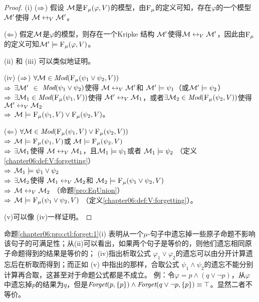 \begin{proof}
	(i) ($\Rightarrow$) 假设 ${\cal M}$是${\textsc{F}_{\textsc{$\mu$}}}(\varphi, V)$的模型，由${\textsc{F}_{\textsc{$\mu$}}}$的定义可知，存在$\varphi$的一个模型${\cal M}'$使得 ${\cal M} \leftrightarrow_V {\cal M}'$。
	
	($\Leftarrow$) 假定${\cal M}$是$\varphi$的模型，则存在一个Kripke 结构 ${\cal M}'$使得${\cal M} \leftrightarrow_V {\cal M}'$，因此由${\textsc{F}_{\textsc{$\mu$}}}$的定义可知${\cal M}' \models {\textsc{F}_{\textsc{$\mu$}}}(\varphi, V)$。
	
	(ii) 和 (iii) 可以类似地证明。
	
	(iv) ($\Rightarrow$) $\forall {\cal M}\in \textit{Mod}({\textsc{F}_{\textsc{$\mu$}}}(\psi_1 \vee \psi_2, V))$\\
	$\Rightarrow$ $\exists {\cal M}'$ $\in$  $\textit{Mod}(\psi_1\vee \psi_2)$使得 ${\cal M} \leftrightarrow_V {\cal M}'$和 ${\cal M}' \models \psi_1$（或${\cal M}' \models \psi_2$） \\
	$\Rightarrow$ $\exists {\cal M}_1 \in \textit{Mod}({\textsc{F}_{\textsc{$\mu$}}}(\psi_1, V))$使得 ${\cal M}' \leftrightarrow_V {\cal M}_1$，或者$\exists{\cal M}_2 \in \textit{Mod}({\textsc{F}_{\textsc{$\mu$}}}(\psi_2, V))$使得 ${\cal M}' \leftrightarrow_V {\cal M}_2$ \\
	$\Rightarrow$ ${\cal M} \models {\textsc{F}_{\textsc{$\mu$}}}(\psi_1, V) \vee {\textsc{F}_{\textsc{$\mu$}}}(\psi_2, V)$。
	
	($\Leftarrow$) $\forall {\cal M} \in \textit{Mod}({\textsc{F}_{\textsc{$\mu$}}}(\psi_1, V) \vee {\textsc{F}_{\textsc{$\mu$}}}(\psi_2, V))$\\
	$\Rightarrow$ ${\cal M} \models {\textsc{F}_{\textsc{$\mu$}}}(\psi_1,V)$或 ${\cal M} \models {\textsc{F}_{\textsc{$\mu$}}}(\psi_2,V)$\\
	$\Rightarrow$ $\exists {\cal M}_1$使得 ${\cal M} \leftrightarrow_V {\cal M}_1$，且${\cal M}_1 \models \psi_1$或者 ${\cal M}_1 \models \psi_2$ \hfill （定义\ref{chapter06:def:V:forgetting}）\\
	$\Rightarrow$ ${\cal M}_1 \models \psi_1 \vee \psi_2$\\
	$\Rightarrow$ $\exists {\cal M}_2$使得 ${\cal M}_1 \leftrightarrow_V {\cal M}_2$和 ${\cal M}_2 \models {\textsc{F}_{\textsc{$\mu$}}}(\psi_1 \vee \psi_2, V)$\\
	$\Rightarrow$ ${\cal M} \leftrightarrow_V {\cal M}_2$ （命题\ref{pro:EqUnion}）\\
	$\Rightarrow$ ${\cal M} \models {\textsc{F}_{\textsc{$\mu$}}}(\psi_1 \vee \psi_2, V)$ （定义\ref{chapter06:def:V:forgetting}）。
	
	 (v)可以像 (iv)一样证明。
\end{proof}

命题\ref{chapter06:pro:ctl:forget:1}(i) 表明从一个$\mu$-句子中遗忘掉一些原子命题不影响该句子的可满足性；从(ii)可以看出，如果两个句子是等价的，则他们遗忘相同原子命题得到的结果是等价的； (iv)指出析取公式 $\varphi_1 \vee \varphi_2$的遗忘可以由分开计算遗忘后在析取而得到；而正如 (v) 中指出的那样，合取公式 $\psi_1 \wedge \psi_2$的遗忘不能分别计算再合取，这甚至对于命题公式都是不成立。
例：令$\varphi=p \wedge (q \vee \neg p)$，从$\varphi$中遗忘掉$p$的结果为$q$，但是$\textit{Forget}(p, \{p\}) \wedge \textit{Forget}(q\vee \neg p, \{p\}) \equiv \top$。显然二者不等价。

